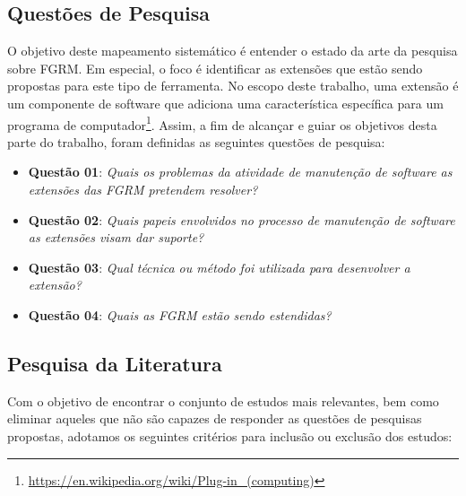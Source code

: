 \documentclass[msc]{ppgccufmg} %
\begin{document}
\subsection{Questões de Pesquisa}
\label{subsec:map-questoes-de-pesquisa}

O objetivo deste mapeamento sistemático é entender o estado da arte da pesquisa sobre FGRM. Em especial, o foco é identificar as extensões que estão sendo propostas para este tipo de ferramenta. No escopo deste trabalho, uma extensão é um componente de software que adiciona uma característica específica para um programa de computador\footnote{\url{https://en.wikipedia.org/wiki/Plug-in_(computing)}}. Assim, a fim de alcançar e guiar os objetivos desta parte do trabalho, foram definidas as seguintes questões de pesquisa:

\begin{itemize}
	\item \textbf{Questão 01}: \textit{Quais os problemas da atividade de manutenção de software as extensões das FGRM pretendem resolver?}
	\item \textbf{Questão 02}: \textit{Quais papeis envolvidos no processo de manutenção de software as extensões visam dar suporte?}
	\item \textbf{Questão 03}: \textit{Qual técnica ou método foi utilizada para desenvolver a extensão?}
	\item \textbf{Questão 04}: \textit{Quais as FGRM estão sendo estendidas?}

\end{itemize}


\subsection{Pesquisa da Literatura}
\label{subsec:map-pesquisa-literatura}

Com o objetivo de encontrar o conjunto de estudos mais relevantes, bem como eliminar aqueles que não são capazes de responder as questões de pesquisas propostas, adotamos os seguintes critérios para inclusão ou exclusão dos estudos:
\end{document}
